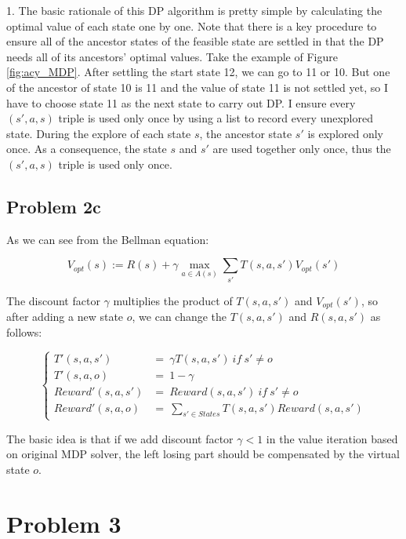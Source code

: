 \documentclass[paper=a4, fontsize=10pt]{scrartcl} %
\numberwithin{equation}{section} %
\numberwithin{figure}{section} %
\numberwithin{table}{section} %
\begin{document}
\begin{spacing}{1.}
The basic rationale of this DP algorithm is pretty simple by calculating the optimal value of each state one by one. Note that there is a key procedure to ensure all of the ancestor states of the feasible state are settled in that the DP needs all of its ancestors' optimal values. Take the example of Figure \ref{fig:acy_MDP}. After settling the start state 12, we can go to 11 or 10. But one of the ancestor of state 10 is 11 and the value of state 11 is not settled yet, so I have to choose state 11 as the next state to carry out DP. I ensure every $(s', a, s)$ triple is used only once by using a list to record every unexplored state. During the explore of each state $s$, the ancestor state $s'$ is explored only once. As a consequence, the state $s$ and $s'$ are used together only once, thus the $(s', a, s)$ triple is used only once.

\subsection{Problem 2c}
As we can see from the Bellman equation:

\begin{equation}
V_{opt}(s) := R(s) + \gamma \max \limits_{a \in A(s)} \sum_{s'} T(s, a, s')V_{opt}(s')
\end{equation}

The discount factor $\gamma$ multiplies the product of $T(s, a, s')$ and $V_{opt}(s')$, so after adding a new state $o$, we can change the $T(s, a, s')$ and $R(s, a, s')$ as follows:

\begin{displaymath}
\left\{
\begin{array}{rl}
T'(s, a, s')&= \ \gamma T(s, a, s') \ if \ s' \ne o\\
T'(s, a, o)&= \ 1 - \gamma\\
Reward'(s, a, s')&= \ Reward(s, a, s') \ if \ s' \ne o\\
Reward'(s, a, o)&= \ \sum_{s' \in States} T(s, a, s')Reward(s, a, s')
\end{array}
\right.
\end{displaymath}

The basic idea is that if we add discount factor $\gamma < 1$ in the value iteration based on original MDP solver, the left losing part should be compensated by the virtual state $o$.

\section{Problem 3}

\end{spacing}
\end{document}

